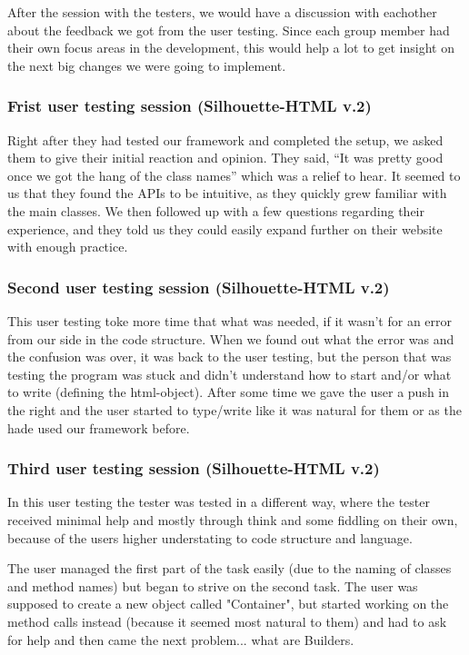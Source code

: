 \documentclass[12pt]{article}
\begin{document}
    After the session with the testers, we would have a discussion with eachother about the feedback we got from the user testing. Since each group member had their own focus areas in the development, this would help a lot to get insight on the next big changes we were going to implement. 

        \subsubsection{Frist user testing session (Silhouette-HTML v.2)}

        Right after they had tested our framework and completed the setup, we asked them to give their initial reaction and opinion. They said, “It was pretty good once we got the hang of the class names” which was a relief to hear. It seemed to us that they found the APIs to be intuitive, as they quickly grew familiar with the main classes. We then followed up with a few questions regarding their experience, and they told us they could easily expand further on their website with enough practice.

        \subsubsection{Second user testing session (Silhouette-HTML v.2)}

        This user testing toke more time that what was needed, if it wasn’t for an error from our side in the code structure. When we found out what the error was and the confusion was over, it was back to the user testing, but the person that was testing the program was stuck and didn’t understand how to start and/or what to write (defining the html-object). After some time we gave the user a push in the right and the user started to type/write like it was natural for them or as the hade used our framework before.

        \subsubsection{Third user testing session (Silhouette-HTML v.2)}

        In this user testing the tester was tested in a different way, where the tester received minimal help and mostly through think and some fiddling on their own, because of the users higher understating to code structure and language.

        The user managed the first part of the task easily (due to the naming of classes and method names) but began to strive on the second task. The user was supposed to create a new object called "Container", but started working on the method calls instead (because it seemed most natural to them) and had to ask for help and then came the next problem... what are Builders.
\end{document}
